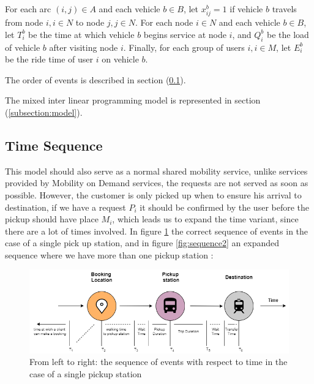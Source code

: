 \documentclass{article}
\begin{document}
For each arc $(i, j) \in A$ and each vehicle $b\in B$, let $x_{ij}^{b} = 1$ if vehicle $b$ travels from node $i, i \in N$ to node $j, j \in N$. For each node $ i \in N$ and each vehicle $b \in B$, let $T^{b}_{i} $ be the time at which vehicle $b$
begins service at node $i$, and $Q^{b}_{i}$ be the load of vehicle $b$ after visiting node $i$. Finally, for each group of users $i, i \in M$, let $E^{b}_{i}$ be the ride time of user $i$ on vehicle $b$.

\noindent The order of events is described in section (\ref{subsec:timeseq}).

\noindent  The mixed inter linear programming model is represented in section (\ref{subsection:model}).

\subsection{Time Sequence}
\label{subsec:timeseq}
This model should also serve as a normal shared mobility service, unlike services provided by Mobility on Demand services, the requests are not served as soon as possible. However, the customer is only picked up when to ensure his arrival to destination, 
if we have a request $P_i$  it should be confirmed by the user before the pickup should have place $M_i$, which leads us to expand the time variant, since there are a lot of times involved. In figure \ref{fig:sequence} the correct sequence of events in the case of a single pick up station, and in figure \ref{fig:sequence2} an expanded sequence where we have more than one pickup station :

\begin{figure}[H]
    \centering 
  \includegraphics[width=\linewidth]{pictures/Time_sequence}
  \caption{From left to right: the sequence of events with respect to time in the case of a single pickup station}
\label{fig:sequence}
\end{figure}
\end{document}
